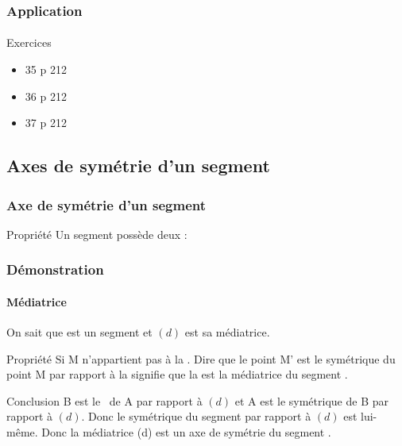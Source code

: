\documentclass[xcolor={dvipsnames}]{beamer}
\begin{document}
\begin{frame}
\frametitle{Application}  
\framesubtitle{}

\begin{block}{Exercices}
	\begin{itemize}
		\item 35 p 212
		\item 36 p 212
		\item 37 p 212
	\end{itemize}
\end{block}
	
\end{frame}

\subsection{Axes de symétrie d'un segment}

\begin{frame}
\frametitle{Axe de symétrie d'un segment}  


\begin{alertblock}{Propriété}
	Un segment possède deux \asyms :
	\begin{itemize}
	\end{itemize}
\end{alertblock}

\end{frame}

\begin{frame}
	\frametitle{Démonstration}  
	\framesubtitle{Médiatrice}

\begin{block}{On sait que}
 est un segment et $(d)$ est sa médiatrice.\pause
\end{block}

\begin{block}{Propriété}
	Si M n'appartient pas à la .
	Dire que le point M' est le symétrique du point M par rapport à la  signifie que la  est la médiatrice du segment .\pause
\end{block}

\begin{block}{Conclusion}
	B est le \sym\  de A par rapport à $(d)$ et A est le symétrique de B par rapport à $(d)$.
	Donc le symétrique du segment  par rapport à $(d)$ est lui-même.
	Donc la médiatrice (d) est un axe de symétrie du segment .
\end{block}
\end{frame}
\end{document}
